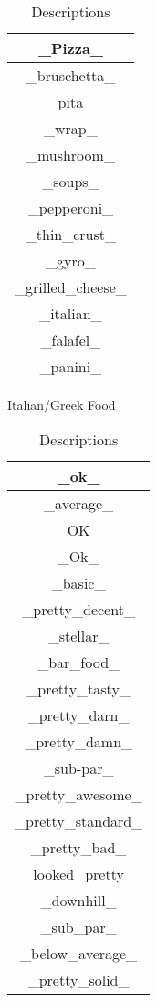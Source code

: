 \documentclass{article}
\begin{document}
\begin{table}[ht]
{\begin{tabular}{|c|}
    \hline
    \_Pizza\_\\
    \hline
    \_bruschetta\_\\
    \hline
    \_pita\_\\
    \hline
    \_wrap\_\\
    \hline
    \_mushroom\_\\
    \hline
    \_soups\_\\
    \hline
    \_pepperoni\_\\
    \hline
    \_thin\_crust\_\\
    \hline
    \_gyro\_\\
    \hline
    \_grilled\_cheese\_\\
    \hline
    \_italian\_\\
    \hline
    \_falafel\_\\
    \hline
    \_panini\_\\
    \hline
    \end{tabular}
    \caption{Italian/Greek Food}
    }
    \hfill
    \parbox{.24\linewidth}{
    \centering
    \begin{tabular}{|c|}
    \hline
    \_ok\_\\
    \hline
    \_average\_\\
    \hline
    \_OK\_\\
    \hline
    \_Ok\_\\
    \hline
    \_basic\_\\
    \hline
    \_pretty\_decent\_\\
    \hline
    \_stellar\_\\
    \hline
    \_bar\_food\_\\
    \hline
    \_pretty\_tasty\_\\
    \hline
    \_pretty\_darn\_\\
    \hline
    \_pretty\_damn\_\\
    \hline
    \_sub-par\_\\
    \hline
    \_pretty\_awesome\_\\
    \hline
    \_pretty\_standard\_\\
    \hline
    \_pretty\_bad\_\\
    \hline
    \_looked\_pretty\_\\
    \hline
    \_downhill\_\\
    \hline
    \_sub\_par\_\\
    \hline
    \_below\_average\_\\
    \hline
    \_pretty\_solid\_\\
    \hline
    \end{tabular}
    \caption{Descriptions}
    }
\end{table}\\
\end{document}
